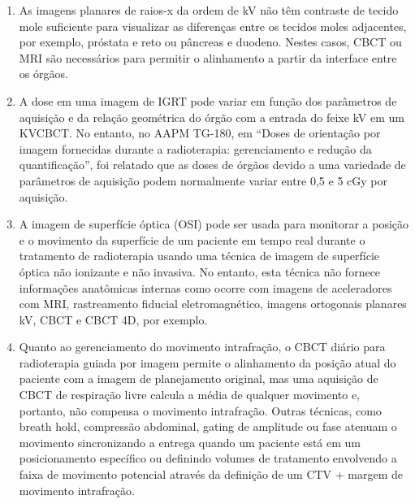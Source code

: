 \documentclass[11pt,a4paper]{article}
\newcounter{exemplo}
\begin{document}
\begin{enumerate}
        \item As imagens planares de raios-x da ordem de kV não têm contraste de tecido mole suficiente para visualizar as diferenças entre os tecidos moles adjacentes, por exemplo, próstata e reto ou pâncreas e duodeno. Nestes casos, CBCT ou MRI são necessários para permitir o alinhamento a partir da interface entre os órgãos.
        
        \item A dose em uma imagem de IGRT pode variar em função dos parâmetros de aquisição e da relação geométrica do órgão com a entrada do feixe kV em um KVCBCT. No entanto, no AAPM TG-180, em “Doses de orientação por imagem fornecidas durante a radioterapia: gerenciamento e redução da quantificação”, foi relatado que as doses de órgãos devido a uma variedade de parâmetros de aquisição podem normalmente variar entre 0,5 e 5 cGy por aquisição.
        
        \item A imagem de superfície óptica (OSI) pode ser usada para monitorar a posição e o movimento da superfície de um paciente em tempo real durante o tratamento de radioterapia usando uma técnica de imagem de superfície óptica não ionizante e não invasiva. No entanto, esta técnica não fornece informações anatômicas internas como ocorre com imagens de aceleradores com MRI, rastreamento fiducial eletromagnético, imagens ortogonais planares kV, CBCT  e CBCT 4D, por exemplo.    
        
        \item Quanto ao gerenciamento do movimento intrafração, o CBCT diário para radioterapia guiada por imagem permite o alinhamento da posição atual do paciente com a imagem de planejamento original, mas uma aquisição de CBCT de respiração livre calcula a média de qualquer movimento e, portanto, não compensa o movimento intrafração. Outras técnicas, como breath hold, compressão abdominal, gating de amplitude ou fase  atenuam o movimento sincronizando a entrega quando um paciente está em um posicionamento específico ou definindo volumes de tratamento envolvendo a faixa de movimento potencial através da definição de um CTV + margem de movimento intrafração. 
        

\end{enumerate}
\end{document}
